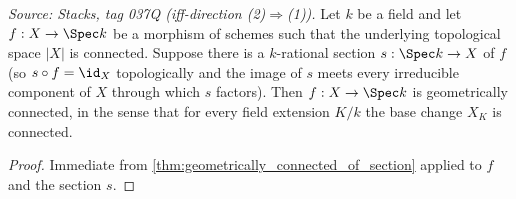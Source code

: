 \begin{lemma}

  \label{lem:geometricallyConnected_of_connected_of_section}
  \textit{Source: Stacks, tag 037Q (iff-direction (2)\(\Rightarrow\)(1)).}
  Let \(k\) be a field and let \(f : X \to \Spec k\) be a morphism of
  schemes such that the underlying topological space \(|X|\) is
  connected. Suppose there is a \(k\)-rational section \(s : \Spec k \to X\)
  of \(f\) (so \(s \circ f = \id_X\) topologically and the image of \(s\)
  meets every irreducible component of \(X\) through which \(s\) factors).
  Then \(f : X \to \Spec k\) is geometrically connected, in the sense
  that for every field extension \(K/k\) the base change \(X_K\) is
  connected.
\end{lemma}
\begin{proof}
  \leanok
  Immediate from \cref{thm:geometrically_connected_of_section} applied
  to \(f\) and the section \(s\).
\end{proof}

